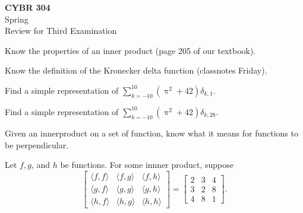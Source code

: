 \documentclass[12pt,fleqn]{exam}
\begin{document}
\begin{flushleft}

{\bf CYBR 304} \\
   Spring \the\year\\
  Review for Third Examination
\end{flushleft}




\begin{questions}

\item Know the properties of an inner product (page 205 of our textbook).

\item Know the definition of the Kronecker delta function (classnotes Friday).

\item Find a simple representation of $\displaystyle \sum_{k=-10}^{10} \left(\uppi^2 + 42\right) \delta_{k,1}$.

\item Find a simple representation of $\displaystyle \sum_{k=-10}^{10} \left(\uppi^2 + 42\right) \delta_{k,28}$.

\item Given an innerproduct on a set of function, know what it means for functions to be perpendicular.

\item Let $f,g$, and $h$ be functions. For some innner product, suppose
\begin{equation}
\begin{bmatrix}
\langle f,f \rangle & \langle f,g \rangle & \langle f,h \rangle \\
\langle g,f \rangle & \langle g,g \rangle & \langle g,h \rangle \\
\langle h,f \rangle & \langle h,g \rangle & \langle h,h \rangle 
\end{bmatrix} = 
\begin{bmatrix} 2 & 3 & 4 \\
                        3 & 2 & 8 \\
                        4 & 8 & 1
\end{bmatrix}.
\end{equation}
\end{questions}
\end{document}
